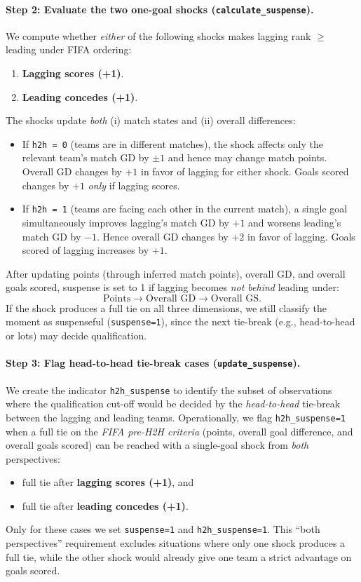 \documentclass[11pt]{article}
\begin{document}
\paragraph{Step 2: Evaluate the two one-goal shocks (\texttt{calculate\_suspense}).}
We compute whether \emph{either} of the following shocks makes lagging rank $\ge$ leading under FIFA ordering:
\begin{enumerate}
    \item \textbf{Lagging scores (+1)}.
    \item \textbf{Leading concedes (+1)}.
\end{enumerate}

\noindent The shocks update \emph{both} (i) match states and (ii) overall differences:
\begin{itemize}
    \item If \texttt{h2h = 0} (teams are in different matches), the shock affects only the relevant team’s match GD by $\pm 1$ and hence may change match points. Overall GD changes by $+1$ in favor of lagging for either shock. Goals scored changes by $+1$ \emph{only} if lagging scores.
    \item If \texttt{h2h = 1} (teams are facing each other in the current match), a single goal simultaneously improves lagging’s match GD by $+1$ and worsens leading’s match GD by $-1$. Hence overall GD changes by $+2$ in favor of lagging. Goals scored of lagging increases by $+1$.
\end{itemize}

\noindent After updating points (through inferred match points), overall GD, and overall goals scored, suspense is set to 1 if lagging becomes \emph{not behind} leading under:
\[
\text{Points} \rightarrow \text{Overall GD} \rightarrow \text{Overall GS}.
\]
If the shock produces a full tie on all three dimensions, we still classify the moment as suspenseful (\texttt{suspense=1}), since the next tie-break (e.g., head-to-head or lots) may decide qualification.

\paragraph{Step 3: Flag head-to-head tie-break cases (\texttt{update\_suspense}).}
We create the indicator \texttt{h2h\_suspense} to identify the subset of observations where the qualification cut-off would be decided by the \emph{head-to-head} tie-break between the lagging and leading teams.
Operationally, we flag \texttt{h2h\_suspense=1} when a full tie on the \emph{FIFA pre-H2H criteria} (points, overall goal difference, and overall goals scored) can be reached with a single-goal shock from \emph{both} perspectives:
\begin{itemize}
    \item full tie after \textbf{lagging scores (+1)}, and
    \item full tie after \textbf{leading concedes (+1)}.
\end{itemize}
Only for these cases we set \texttt{suspense=1} and \texttt{h2h\_suspense=1}. 
This ``both perspectives'' requirement excludes situations where only one shock produces a full tie, while the other shock would already give one team a strict advantage on goals scored.
\end{document}
